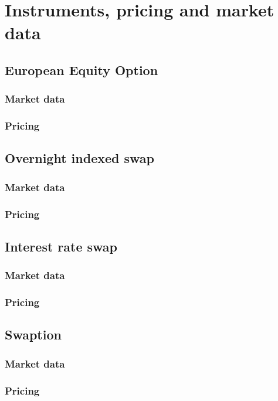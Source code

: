 \documentclass[../Thesis_AHoecherl.tex]{subfiles}
\begin{document}
    \section{Instruments, pricing and market data}\label{Instruments, pricing and market data}
    \subsection{European Equity Option}
    \subsubsection{Market data}
    \subsubsection{Pricing}
    \subsection{Overnight indexed swap}
    \subsubsection{Market data}
    \subsubsection{Pricing}
    \subsection{Interest rate swap}
    \subsubsection{Market data}
    \subsubsection{Pricing} 
    \subsection{Swaption}
    \subsubsection{Market data}
    \subsubsection{Pricing}
\end{document}
